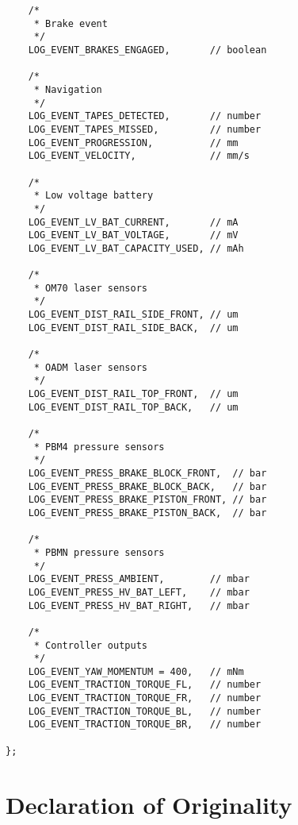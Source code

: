 \begin{verbatim}
    /*
     * Brake event
     */
    LOG_EVENT_BRAKES_ENGAGED,       // boolean

    /*
     * Navigation
     */
    LOG_EVENT_TAPES_DETECTED,       // number
    LOG_EVENT_TAPES_MISSED,         // number
    LOG_EVENT_PROGRESSION,          // mm
    LOG_EVENT_VELOCITY,             // mm/s

    /*
     * Low voltage battery
     */
    LOG_EVENT_LV_BAT_CURRENT,       // mA
    LOG_EVENT_LV_BAT_VOLTAGE,       // mV
    LOG_EVENT_LV_BAT_CAPACITY_USED, // mAh

    /*
     * OM70 laser sensors
     */
    LOG_EVENT_DIST_RAIL_SIDE_FRONT, // um
    LOG_EVENT_DIST_RAIL_SIDE_BACK,  // um

    /*
     * OADM laser sensors
     */
    LOG_EVENT_DIST_RAIL_TOP_FRONT,  // um
    LOG_EVENT_DIST_RAIL_TOP_BACK,   // um

    /*
     * PBM4 pressure sensors
     */
    LOG_EVENT_PRESS_BRAKE_BLOCK_FRONT,  // bar
    LOG_EVENT_PRESS_BRAKE_BLOCK_BACK,   // bar
    LOG_EVENT_PRESS_BRAKE_PISTON_FRONT, // bar
    LOG_EVENT_PRESS_BRAKE_PISTON_BACK,  // bar

    /*
     * PBMN pressure sensors
     */
    LOG_EVENT_PRESS_AMBIENT,        // mbar
    LOG_EVENT_PRESS_HV_BAT_LEFT,    // mbar
    LOG_EVENT_PRESS_HV_BAT_RIGHT,   // mbar

    /*
     * Controller outputs
     */
    LOG_EVENT_YAW_MOMENTUM = 400,   // mNm
    LOG_EVENT_TRACTION_TORQUE_FL,   // number
    LOG_EVENT_TRACTION_TORQUE_FR,   // number
    LOG_EVENT_TRACTION_TORQUE_BL,   // number
    LOG_EVENT_TRACTION_TORQUE_BR,   // number

};
\end{verbatim}

%


\chapter{Declaration of Originality}\label{chap:originality}


